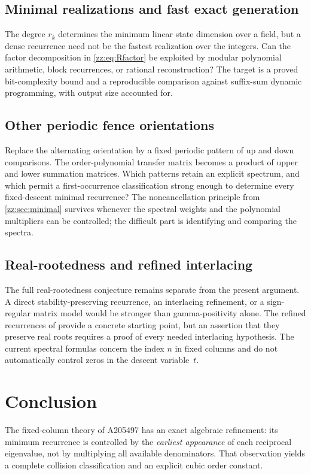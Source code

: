 \documentclass[11pt,a4paper]{article}
\theoremstyle{definition}
\begin{document}
\subsection{Minimal realizations and fast exact generation}
The degree $r_k$ determines the minimum linear state dimension over a field,
but a dense recurrence need not be the fastest realization over the integers.
Can the factor decomposition in \eqref{zz:eq:Rfactor} be exploited by modular
polynomial arithmetic, block recurrences, or rational reconstruction?
The target is a proved bit-complexity bound and a reproducible comparison
against suffix-sum dynamic programming, with output size accounted for.

\subsection{Other periodic fence orientations}
Replace the alternating orientation by a fixed periodic pattern of up and
down comparisons.  The order-polynomial transfer matrix becomes a product of
upper and lower summation matrices.
Which patterns retain an explicit spectrum, and which permit a first-occurrence
classification strong enough to determine every fixed-descent minimal
recurrence?  The noncancellation principle from \cref{zz:sec:minimal} survives
whenever the spectral weights and the polynomial multipliers can be controlled;
the difficult part is identifying and comparing the spectra.

\subsection{Real-rootedness and refined interlacing}
The full real-rootedness conjecture remains separate from the present
argument.  A direct stability-preserving recurrence, an interlacing refinement,
or a sign-regular matrix model would be stronger than gamma-positivity alone.
The refined recurrences of \cite{pz} provide a concrete starting point, but
an assertion that they preserve real roots requires a proof of every needed
interlacing hypothesis.  The current spectral formulas concern the index $n$
in fixed columns and do not automatically control zeros in the descent
variable~$t$.

\section{Conclusion}
The fixed-column theory of A205497 has an exact algebraic refinement: its
minimum recurrence is controlled by the \emph{earliest appearance} of each
reciprocal eigenvalue, not by multiplying all available denominators.
That observation yields a complete collision classification and an explicit
cubic order constant.
\end{document}

